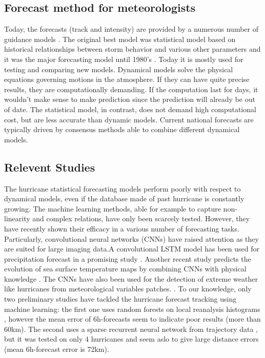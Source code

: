 \subsection{Forecast method for meteorologists}
Today, the forecasts (track and intensity) are provided by a numerous number of guidance models \cite{nhc_models}. The original best model was statistical model based on historical relationships between storm behavior and various other parameters and it was the major forecasting model until 1980's \cite{demaria2005further}. Today it is mostly used for testing and comparing new models. Dynamical models solve the physical equations governing motions in the atmosphere. If they can have quite precise results, they are computationally demanding. If the computation last for days, it wouldn't make sense to make prediction since the prediction will already be out of date. The statistical model, in contrast, does not demand high computational cost, but are less accurate than dynamic models. Current national forecasts are typically driven by consensus methods able to combine different dynamical models.


\subsection{Relevent Studies}
The hurricane statistical forecasting models perform poorly with respect to dynamical models, even if the database made of past hurricane is constantly growing. The machine learning methods, able for example to capture non-linearity and complex relations, have only been scarcely tested. However, they have recently shown their efficacy in a various number of forecasting tasks. Particularly, convolutional neural networks (CNNs) have raised attention as they are suited for large imaging data.A convolutional LSTM model has been used for precipitation forecast in a promising study \cite{xingjian2015convolutional}. Another recent study predicts the evolution of sea surface temperature maps by combining CNNs with physical knowledge \cite{de2017deep}. The CNNs have also been used for the detection of extreme weather like hurricanes from meteorological variables patches. \cite{racah2017extremeweather}.
To our knowledge, only two preliminary studies have tackled the hurricane forecast tracking using machine learning: the first one uses random forests on local reanalysis histograms \cite{liberge2011prevision}, however the mean error of 6h-forecasts seem to indicate poor results (more than 60km). The second uses a sparse recurrent neural network from trajectory data \cite{moradi2016sparse}, but it was tested on only 4 hurricanes and seem aslo to give large distance errors (mean 6h-forecast error is 72km).




